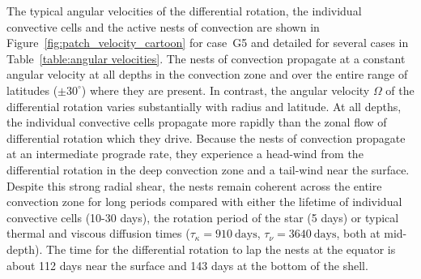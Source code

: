  
The typical angular velocities of the differential rotation, the
individual convective cells and the active nests of convection are
shown in Figure~\ref{fig:patch_velocity_cartoon} for case~G5 and
detailed for several cases in Table~\ref{table:angular velocities}.  The nests of
convection propagate at a constant angular velocity at all depths in
the convection zone and over the entire range of latitudes ($\pm
30^\circ$) where they are present.  In contrast, the angular velocity $\Omega$
of the differential rotation varies substantially with radius and
latitude.  At all depths, the individual convective cells propagate
more rapidly than the zonal flow of differential rotation which they drive.  Because
the nests of convection propagate at an intermediate prograde rate,
they experience a head-wind from the differential rotation in the deep
convection zone and a tail-wind near the
surface.  Despite this strong radial shear, the
nests remain coherent across the entire convection zone for long
periods compared with either the lifetime of individual convective
cells (10-30 days), the rotation period of the star (5 days) or
typical thermal and viscous diffusion times ($\tau_\kappa =
910~\mathrm{days}$, $\tau_\nu=3640~\mathrm{days}$, both at mid-depth).
The time for the differential rotation to lap the nests at the
equator is about 112 days near the surface and 143 days at the bottom of the shell.

